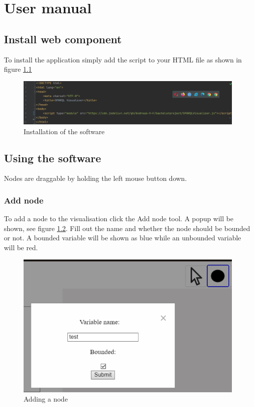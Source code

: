 \chapter{User manual}
\section{Install web component}
To install the application simply add the script to your HTML file as shown in figure \ref{fig:install}
\begin{figure}[H]
    \centering
    \includegraphics[width=1\textwidth]{figures/install.pdf}
    \caption{Installation of the software}
    \label{fig:install}
\end{figure}
\section{Using the software}
Nodes are draggable by holding the left mouse button down. 
\subsection{Add node}
To add a node to the visualisation click the Add node tool. A popup will be shown, see figure \ref{fig:user-add}. Fill out the name and whether the node should be bounded or not. A bounded variable will be shown as blue while an unbounded variable will be red.

\begin{figure}[H]
    \centering
    \includegraphics[width=1\textwidth]{figures/add-node-user.pdf}
    \caption{Adding a node}
    \label{fig:user-add}
\end{figure}
